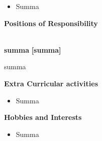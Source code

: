 \documentclass[a4paper,10pt]{article}
\begin{document}
    \begin{itemize} 
 \setlength{\itemsep}{1pt}
\item Summa
\end{itemize}

\colorbox{titleColor}{\parbox{6.7in}{\textbf{Positions of Responsibility}}}\\

\textbf{summa}  \hfill {\small{{\textbf{[summa]}}}\/} 
\begin{itemize*} 

        \item summa 

        \end{itemize*}

\colorbox{titleColor}{\parbox{6.7in}{\textbf{Extra Curricular activities}}}

\begin{itemize}

    \setlength{\itemsep}{1pt}
\item Summa \hfill 
\end{itemize}

\colorbox{titleColor}{\parbox{6.7in}{\textbf{Hobbies and Interests}}}

\begin{itemize}
        \setlength{\itemsep}{1pt}
\item Summa
\end{itemize}
\end{document}
